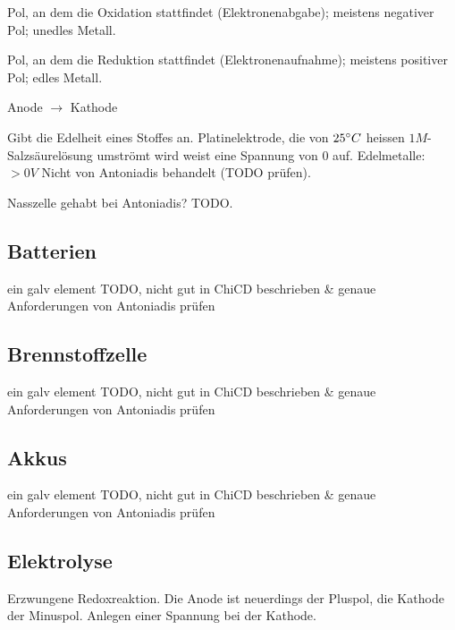 \begin{definition}[Anode]
	Pol, an dem die Oxidation stattfindet (Elektronenabgabe); meistens negativer Pol; unedles Metall.
\end{definition}

\begin{definition}[Kathode]
	Pol, an dem die Reduktion stattfindet (Elektronenaufnahme); meistens positiver Pol; edles Metall.
\end{definition}

\begin{definition}[Stromfluss]
	Anode $\rightarrow$ Kathode
\end{definition}

\begin{definition}[Standardreduktionspotential]
	Gibt die Edelheit eines Stoffes an. Platinelektrode, die von $25\degree C$ heissen $1M$-Salzsäurelösung umströmt wird weist eine Spannung von $0$ auf.
	Edelmetalle: $>0V$ Nicht von Antoniadis behandelt (TODO prüfen).
\end{definition}


Nasszelle gehabt bei Antoniadis? TODO.

\subsection{Batterien}

ein galv element
TODO, nicht gut in ChiCD beschrieben \& genaue Anforderungen von Antoniadis prüfen

\subsection{Brennstoffzelle}

ein galv element
TODO, nicht gut in ChiCD beschrieben \& genaue Anforderungen von Antoniadis prüfen

\subsection{Akkus}

ein galv element
TODO, nicht gut in ChiCD beschrieben \& genaue Anforderungen von Antoniadis prüfen

\subsection{Elektrolyse}

Erzwungene Redoxreaktion. Die Anode ist neuerdings der Pluspol, die Kathode der Minuspol. Anlegen einer Spannung bei der Kathode.

